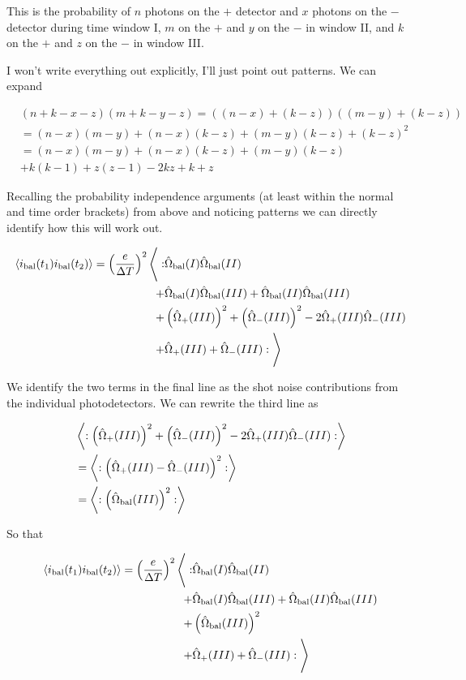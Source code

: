 \documentclass[12pt]{article}
\begin{document}
This is the probability of $n$ photons on the $+$ detector and $x$ photons on the $-$ detector during time window I, $m$ on the $+$ and $y$ on the $-$ in window II, and $k$ on the $+$ and $z$ on the $-$ in window III.

I won't write everything out explicitly, I'll just point out patterns. We can expand

\begin{align}
&(n+k-x-z)(m+k-y-z) = ((n-x) + (k-z))((m-y) + (k-z)) \\
&=(n-x)(m-y) + (n-x)(k-z) + (m-y)(k-z) + (k-z)^2\\
&= (n-x)(m-y) + (n-x)(k-z) + (m-y)(k-z)\\
&+ k(k-1) + z(z-1) - 2 kz + k + z
\end{align}

Recalling the probability independence arguments (at least within the normal and time order brackets) from above and noticing patterns we can directly identify how this will work out.

\begin{align}
\Braket{i_{\text{bal}}(t_1)i_{\text{bal}}(t_2)} = \left(\frac{e}{\Delta T}\right)^2 \Bigg \langle: &\hat{\Omega}_{\text{bal}}(I) \hat{\Omega}_{\text{bal}}(II)\\
+ &\hat{\Omega}_{\text{bal}}(I) \hat{\Omega}_{\text{bal}}(III) + \hat{\Omega}_{\text{bal}}(II) \hat{\Omega}_{\text{bal}}(III)\\
+ &\left(\hat{\Omega}_+(III)\right)^2 + \left(\hat{\Omega}_-(III)\right)^2 - 2 \hat{\Omega}_+(III) \hat{\Omega}_-(III)\\
+&\hat{\Omega}_+(III) + \hat{\Omega}_-(III)
:\Bigg \rangle
\end{align}

We identify the two terms in the final line as the shot noise contributions from the individual photodetectors. We can rewrite the third line as

\begin{align}
&\Braket{:\left(\hat{\Omega}_+(III)\right)^2 + \left(\hat{\Omega}_-(III)\right)^2 - 2 \hat{\Omega}_+(III) \hat{\Omega}_-(III):}\\
&= \Braket{:\left(\hat{\Omega}_+(III) - \hat{\Omega}_-(III)\right)^2 :}\\
&= \Braket{:\left(\hat{\Omega}_{\text{bal}}(III) \right)^2 :}
\end{align}

So that

\begin{align}
\Braket{i_{\text{bal}}(t_1)i_{\text{bal}}(t_2)} = \left(\frac{e}{\Delta T}\right)^2 \Bigg \langle: &\hat{\Omega}_{\text{bal}}(I) \hat{\Omega}_{\text{bal}}(II)\\
+ &\hat{\Omega}_{\text{bal}}(I) \hat{\Omega}_{\text{bal}}(III) + \hat{\Omega}_{\text{bal}}(II) \hat{\Omega}_{\text{bal}}(III)\\
+ &\left(\hat{\Omega}_{\text{bal}}(III) \right)^2\\
+&\hat{\Omega}_+(III) + \hat{\Omega}_-(III)
:\Bigg \rangle
\end{align}
\end{document}
